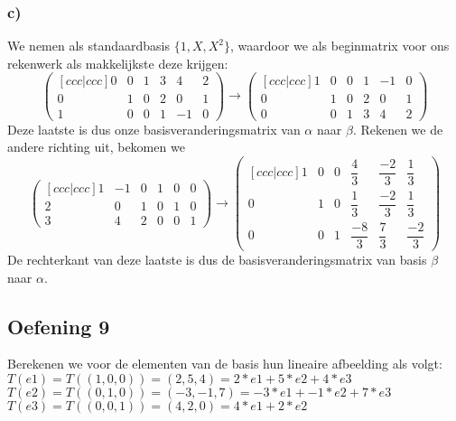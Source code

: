 \documentclass[lineaire_algebra_oplossingen.tex]{subfiles}
\begin{document}
\subsubsection*{c)}
We nemen als standaardbasis $\{1, X, X^2\}$, waardoor we als beginmatrix voor ons rekenwerk als makkelijkste deze krijgen:
\[
\begin{pmatrix}[ccc|ccc]
0 & 0 & 1 & 3 & 4 & 2\\
0 & 1 & 0 & 2 & 0 & 1\\
1 & 0 & 0 & 1 & -1 & 0
\end{pmatrix}
\longrightarrow
\begin{pmatrix}[ccc|ccc]
1 & 0 & 0 & 1 & -1 & 0\\
0 & 1 & 0 & 2 & 0 & 1\\
0 & 0 & 1 & 3 & 4 & 2
\end{pmatrix}
\]
Deze laatste is dus onze basisveranderingsmatrix van $\alpha$ naar $\beta$. Rekenen we de andere richting uit, bekomen we
\[
\begin{pmatrix}[ccc|ccc]
1 & -1 & 0 & 1 & 0 & 0\\
2 & 0 & 1 & 0 & 1 & 0\\
3 & 4 & 2 & 0 & 0 & 1
\end{pmatrix}
\longrightarrow
\begin{pmatrix}[ccc|ccc]
1 & 0 & 0 & \dfrac{4}{3}  & \dfrac{-2}{3}  & \dfrac{1}{3}\\[8pt]
0 & 1 & 0 & \dfrac{1}{3}  & \dfrac{-2}{3} & \dfrac{1}{3}\\[8pt]
0 & 0 & 1 & \dfrac{-8}{3} & \dfrac{7}{3}  & \dfrac{-2}{3}
\end{pmatrix}
\]
De rechterkant van deze laatste is dus de basisveranderingsmatrix van basis $\beta$ naar $\alpha$.

\subsection{Oefening 9}

Berekenen we voor de elementen van de basis hun lineaire afbeelding als volgt:\\

$T(e1) = T( (1,0,0) ) = (2,5,4) = 2 * e1 + 5 * e2 + 4 * e3$\\

$T(e2) = T( (0,1,0) ) = (-3,-1,7) = -3 * e1 + -1 * e2 + 7 * e3$\\

$T(e3) = T( (0,0,1) ) = (4,2,0) = 4 * e1 + 2 * e2$\\
\end{document}
